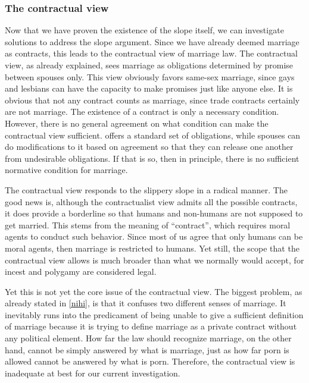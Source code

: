 \documentclass[man,floatsintext]{apa7}
\begin{document}
\subsubsection{The contractual view}

Now that we have proven the existence of the slope itself, we can investigate solutions to address the slope argument. Since we have already deemed marriage as contracts, this leads to the contractual view of marriage law. The contractual view, as already explained, sees marriage as obligations determined by promise between spouses only.\autocite{brakeMarriageDomesticPartnership2023} This view obviously favors same-sex marriage, since gays and lesbians can have the capacity to make promises just like anyone else. It is obvious that not any contract counts as marriage, since trade contracts certainly are not marriage. The existence of a contract is only a necessary condition. However, there is no general agreement on what condition can make the contractual view sufficient.\autocite{morseWhyUnilateralDivorce2006,houlgateChildrenRightsState2005} \textcite{wasserstromAdulteryImmoral1974} offers a standard set of obligations, while spouses can do modifications to it based on agreement so that they can release one another from undesirable obligations. If that is so, then in principle, there is no sufficient normative condition for marriage.

The contractual view responds to the slippery slope in a radical manner. The good news is, although the contractualist view admits all the possible contracts, it does provide a borderline so that humans and non-humans are not supposed to get married. This stems from the meaning of ``contract'', which requires moral agents to conduct such behavior. Since most of us agree that only humans can be moral agents, then marriage is restricted to humans. Yet still, the scope that the contractual view allows is much broader than what we normally would accept, for incest and polygamy are considered legal.

Yet this is not yet the core issue of the contractual view. The biggest problem, as already stated in \ref{nihi}, is that it confuses two different senses of marriage. It inevitably runs into the predicament of being unable to give a sufficient definition of marriage because it is trying to define marriage as a private contract without any political element. How far the law should recognize marriage, on the other hand, cannot be simply answered by what is marriage, just as how far porn is allowed cannot be answered by what is porn. Therefore, the contractual view is inadequate at best for our current investigation.
\end{document}
